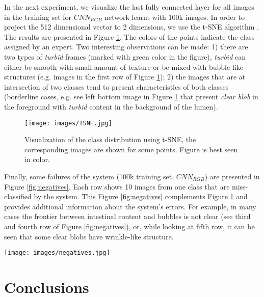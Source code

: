 \documentclass[review,12pt,3p]{elsarticle}
\begin{document}
In the next experiment, we visualize the last fully connected layer for all images in the training set for $CNN_{RGB}$ network learnt with 100k images. In order to project the 512 dimensional vector to 2 dimensions, we use the t-SNE algorithm \cite{t_SNE}. The results are presented in Figure \ref{fig:class}. The colors of the points indicate the class assigned by an expert. Two interesting observations can be made: 1) there are two types of \emph{turbid} frames (marked with green color in the figure), \emph{turbid} can either be smooth with small amount of texture or be mixed with bubble like structures (e.g. images in the first row of Figure \ref{fig:class}); 2) the images that are at intersection of two classes tend to present characteristics of both classes (borderline cases, e.g. see left bottom image in Figure \ref{fig:class} that present \emph{clear blob} in the foreground with \emph{turbid} content in the background of the lumen).


\begin{figure}[!ht]
\centering
\texttt{[image: images/TSNE.jpg]}
\caption{Visualization of the class distribution using t-SNE, the corresponding images are shown for some points. Figure is best seen in color.}
\label{fig:class}
\end{figure}


Finally, some failures of the system (100k training set, $CNN_{RGB}$) are presented in Figure \ref{fig:negatives}. Each row shows 10 images from one class that are miss-classified by the system. This Figure \ref{fig:negatives} complements Figure \ref{fig:class} and provides additional information about the system's errors. For example, in many cases the frontier between intestinal content and bubbles is not clear (see third and fourth row of Figure \ref{fig:negatives}), or, while looking at fifth row, it can be seen that some clear blobs have wrinkle-like structure.

\begin{figure*}[!ht]
\centering
\texttt{[image: images/negatives.jpg]}
\caption{Images, where the proposed system fails. Each row contains sample images from one event and at the top of the images, the predicted label is printed. }
\label{fig:negatives}
\end{figure*}

\section{Conclusions}
\end{document}
